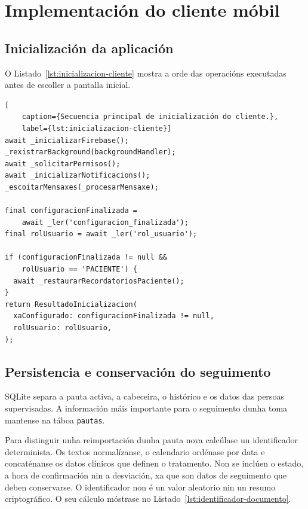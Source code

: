 \section{Implementación do cliente móbil}

\subsection{Inicialización da aplicación}

O Listado~\ref{lst:inicializacion-cliente} mostra a orde das operacións executadas antes de escoller a pantalla inicial.

\begin{lstlisting}[
    caption={Secuencia principal de inicialización do cliente.},
    label={lst:inicializacion-cliente}]
await _inicializarFirebase();
_rexistrarBackground(backgroundHandler);
await _solicitarPermisos();
await _inicializarNotificacions();
_escoitarMensaxes(_procesarMensaxe);

final configuracionFinalizada =
    await _ler('configuracion_finalizada');
final rolUsuario = await _ler('rol_usuario');

if (configuracionFinalizada != null &&
    rolUsuario == 'PACIENTE') {
  await _restaurarRecordatoriosPaciente();
}
return ResultadoInicializacion(
  xaConfigurado: configuracionFinalizada != null,
  rolUsuario: rolUsuario,
);
\end{lstlisting}

\subsection{Persistencia e conservación do seguimento}

SQLite separa a pauta activa, a cabeceira, o histórico e os datos das persoas supervisadas. A información máis importante para o seguimento dunha toma
mantense na táboa \texttt{pautas}.

Para distinguir unha reimportación dunha pauta nova calcúlase un identificador determinista. Os textos normalízanse, o calendario ordénase por data e
concaténanse os datos clínicos que definen o tratamento. Non se inclúen o estado, a hora de confirmación nin a desviación, xa que son datos de seguimento que deben conservarse. O identificador non é un valor aleatorio nin un resumo criptográfico. O seu cálculo móstrase no Listado~\ref{lst:identificador-documento}.

